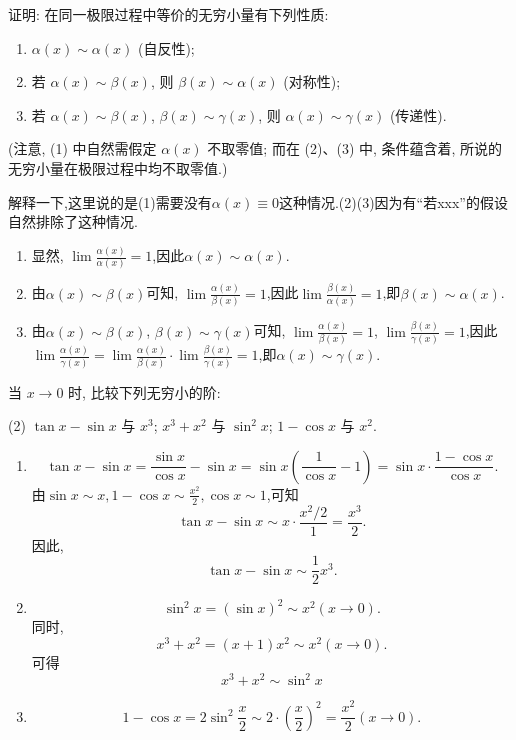 \begin{exercise}[1.3.15]
    证明: 在同一极限过程中等价的无穷小量有下列性质:
    \begin{enumerate}
        \item $\alpha(x) \sim \alpha(x)$ (自反性);
        \item 若 $\alpha(x) \sim \beta(x)$, 则 $\beta(x) \sim \alpha(x)$ (对称性);
        \item 若 $\alpha(x) \sim \beta(x)$, $\beta(x) \sim \gamma(x)$, 则 $\alpha(x) \sim \gamma(x)$ (传递性).
    \end{enumerate}
    (注意, (1) 中自然需假定 $\alpha(x)$ 不取零值; 而在 (2)、(3) 中, 条件蕴含着, 所说的无穷小量在极限过程中均不取零值.)
\end{exercise}

\begin{solution}
    解释一下,这里说的是(1)需要没有$\alpha(x)\equiv 0$这种情况.(2)(3)因为有“若xxx”的假设自然排除了这种情况.
    \begin{enumerate}[(1)]
        \item 显然, $\lim \frac{\alpha(x)}{\alpha(x)} = 1$,因此$\alpha(x) \sim \alpha(x)$.
        \item 由$\alpha(x) \sim \beta(x)$可知, $\lim \frac{\alpha(x)}{\beta(x)} = 1$,因此$\lim \frac{\beta(x)}{\alpha(x)} = 1$,即$\beta(x) \sim \alpha(x)$.
        \item 由$\alpha(x) \sim \beta(x)$, $\beta(x) \sim \gamma(x)$可知, $\lim \frac{\alpha(x)}{\beta(x)} = 1$, $\lim \frac{\beta(x)}{\gamma(x)} = 1$,因此$\lim \frac{\alpha(x)}{\gamma(x)} = \lim \frac{\alpha(x)}{\beta(x)} \cdot \lim \frac{\beta(x)}{\gamma(x)} = 1$,即$\alpha(x) \sim \gamma(x)$.
    \end{enumerate}
\end{solution}

\begin{exercise}[1.3.16]
    当 $x \to 0$ 时, 比较下列无穷小的阶:
    \begin{tasks}[label=(\arabic*)](2)
        \task $\tan x - \sin x$ 与 $x^3$;
        \task $x^3+x^2$ 与 $\sin^2 x$;
        \task $1-\cos x$ 与 $x^2$.
    \end{tasks}
\end{exercise}

\begin{solution}
    \begin{enumerate}[(1)]
        \item $$\tan x - \sin x = \frac{\sin x}{\cos x} - \sin x = \sin x \left( \frac{1}{\cos x} - 1 \right) = \sin x \cdot \frac{1 - \cos x}{\cos x}.$$
              由$\sin x \sim x, 1 - \cos x \sim \frac{x^2}{2}, \cos x \sim 1$,可知$$\tan x - \sin x \sim x \cdot \frac{x^2 / 2}{1} = \frac{x^3}{2}.$$
              因此, $$\tan x - \sin x \sim \frac{1}{2} x^3.$$
        \item $$\sin^2 x = (\sin x)^2 \sim x^2  (x \to 0).$$
              同时, $$x^3 + x^2=(x+1)x^2\sim x^2   (x \to 0).$$
              可得$$x^3 + x^2\sim \sin^2 x$$
        \item $$1 - \cos x = 2 \sin^2 \frac{x}{2} \sim 2 \cdot \left( \frac{x}{2} \right)^2 = \frac{x^2}{2} (x \to 0).$$
    \end{enumerate}
\end{solution}

